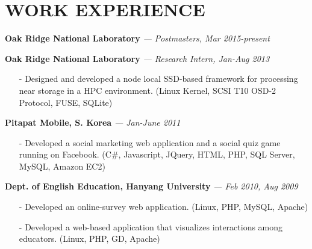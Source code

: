 \section{WORK EXPERIENCE} 
\vspace{0.03in} 
{\bf Oak Ridge National Laboratory}
{\it \footnotesize --- Postmasters, Mar 2015-present}
\vspace{-0.15in}

{\bf Oak Ridge National Laboratory}
{\it \footnotesize --- Research Intern, Jan-Aug 2013}
\begin{itemize}[leftmargin=*]
\setlength\itemsep{-0.02in}
 \item[-] Designed and developed a node local SSD-based framework for processing near
  storage in a HPC environment.
  {\small(Linux Kernel, SCSI T10 OSD-2 Protocol, FUSE, SQLite)}
\end{itemize}
\vspace{-0.15in}
{\bf Pitapat Mobile, S. Korea}
{\it \footnotesize --- Jan-June 2011}
\begin{itemize}[leftmargin=*]
\setlength\itemsep{-0.02in}
 \item[-] Developed a social marketing web application and a social quiz game running on
  Facebook.
  {\small(C\#, Javascript, JQuery, HTML, PHP, SQL Server, MySQL, Amazon EC2)}
\end{itemize}
\vspace{-0.15in}

{\bf Dept. of English Education, Hanyang University}
{\it \footnotesize --- Feb 2010, Aug 2009}
\begin{itemize}[leftmargin=*]
\setlength\itemsep{-0.02in}
 \item[-] Developed an online-survey web application.
          {\small(Linux, PHP, MySQL, Apache)}
 \item[-] Developed a web-based application that visualizes interactions among educators.
          {\small(Linux, PHP, GD, Apache)}
\end{itemize}
\vspace{-0.15in}

